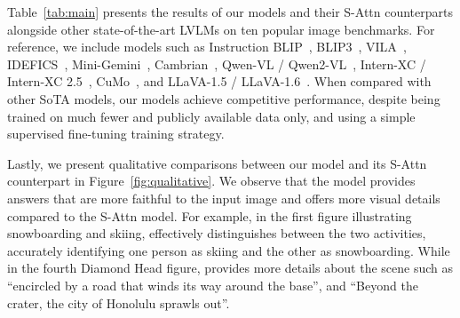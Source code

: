 
Table~\ref{tab:main} presents the results of our \method{} models and their S-Attn counterparts alongside other state-of-the-art LVLMs on ten popular image benchmarks.
For reference, we include models such as Instruction BLIP~\citep{dai2023instructblip}, BLIP3~\citep{blip3}, VILA~\citep{lin2024vila}, IDEFICS~\citep{laurenccon2024obelics}, Mini-Gemini~\citep{li2024mini}, Cambrian~\citep{tong2024cambrian}, Qwen-VL / Qwen2-VL~\citep{wang2024qwen2}, Intern-XC / Intern-XC 2.5~\citep{zhang2024internlm}, CuMo~\citep{li2024cumo}, and LLaVA-1.5 / LLaVA-1.6~\citep{llava, llava_next}.
When compared with other SoTA models, our \method{} models achieve competitive performance, despite being trained on much fewer and publicly available data only, and using a simple supervised fine-tuning training strategy.


Lastly, we present qualitative comparisons between our \method{} model and its S-Attn counterpart in Figure~\ref{fig:qualitative}.
We observe that the \method{} model provides answers that are more faithful to the input image and offers more visual details compared to the S-Attn model.
For example, in the first figure illustrating snowboarding and skiing, \method{} effectively distinguishes between the two activities, accurately identifying one person as skiing and the other as snowboarding.
While in the fourth Diamond Head figure, \method{} provides more details about the scene such as ``encircled by a road that winds its way around the base'', and ``Beyond the crater, the city of Honolulu sprawls out''.

